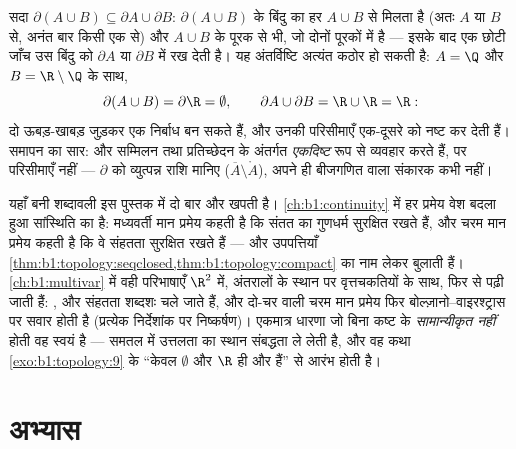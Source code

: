 \begin{example}[सम्मिलन के अंतर्गत परिसीमाएँ]\label{ex:b1:topology:boundaryunion}
सदा $\partial(A \cup B) \subseteq \partial A \cup \partial B$: $\partial(A
\cup B)$ के बिंदु का हर  $A \cup B$ से मिलता है (अतः $A$ या $B$ से,
अनंत बार किसी एक से) और $A \cup B$ के पूरक से भी, जो दोनों पूरकों में है ---
इसके बाद एक छोटी जाँच उस बिंदु को $\partial A$ या $\partial B$ में रख देती
है। यह अंतर्विष्टि अत्यंत कठोर हो सकती है: $A = \Q$ और $B = \R\setminus\Q$
के साथ,
\[
\partial(A \cup B) = \partial \R = \emptyset ,
\qquad
\partial A \cup \partial B = \R \cup \R = \R :
\]
दो ऊबड़-खाबड़  जुड़कर एक निर्बाध  बन सकते हैं, और उनकी
परिसीमाएँ एक-दूसरे को नष्ट कर देती हैं। समापन का सार:  और 
सम्मिलन तथा प्रतिच्छेदन के अंतर्गत \emph{एकदिष्ट} रूप से व्यवहार करते हैं,
पर परिसीमाएँ नहीं --- $\partial$ को व्युत्पन्न राशि मानिए ($\overline A
\setminus \mathring A$), अपने ही बीजगणित वाला संकारक कभी नहीं।
\end{example}

\begin{remark}[इस खंड के भीतर आगे की दृष्टि]
यहाँ बनी शब्दावली इस पुस्तक में दो बार और खपती है। \cref{ch:b1:continuity}
में हर प्रमेय वेश बदला हुआ सांस्थिति का  है: मध्यवर्ती मान प्रमेय कहती है
कि संतत   का गुणधर्म सुरक्षित रखते हैं, और चरम मान प्रमेय
कहती है कि वे संहतता सुरक्षित रखते हैं --- और उपपत्तियाँ
\cref{thm:b1:topology:seqclosed,thm:b1:topology:compact} का नाम लेकर बुलाती
हैं। \cref{ch:b1:multivar} में वही परिभाषाएँ $\R^2$ में, अंतरालों के स्थान
पर वृत्तचकतियों के साथ, फिर से पढ़ी जाती हैं: ,  और संहतता
शब्दशः चले जाते हैं, और दो-चर वाली चरम मान प्रमेय फिर बोल्ज़ानो--वाइरश्ट्रास
पर सवार होती है (प्रत्येक निर्देशांक पर निष्कर्षण)। एकमात्र धारणा जो बिना
कष्ट के \emph{सामान्यीकृत नहीं} होती वह स्वयं  है --- समतल में उत्तलता
का स्थान संबद्धता ले लेती है, और वह कथा \cref{exo:b1:topology:9} के ``केवल
$\emptyset$ और $\R$ ही  और  हैं'' से आरंभ होती है।
\end{remark}

\section{अभ्यास}

